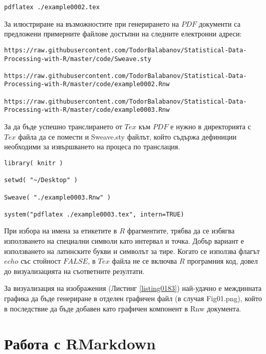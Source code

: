 \begin{lstlisting}[caption=Транслиране от Tex до PDF, label=listing0181]
pdflatex ./example0002.tex
\end{lstlisting}

За илюстриране на възможностите при генерирането на $PDF$ документи са предложени примерните файлове достъпни на следните електронни адреси:

\begin{lstlisting}[caption=Адрес на примерени $LaTeX$ документи, label=listing0182]
https://raw.githubusercontent.com/TodorBalabanov/Statistical-Data-Processing-with-R/master/code/Sweave.sty

https://raw.githubusercontent.com/TodorBalabanov/Statistical-Data-Processing-with-R/master/code/example0002.Rnw

https://raw.githubusercontent.com/TodorBalabanov/Statistical-Data-Processing-with-R/master/code/example0003.Rnw
\end{lstlisting}

За да бъде успешно транслирането от $Tex$ към $PDF$ е нужно в директорията с $Tex$ файла да се помести и Sweave.sty файлът, който съдържа дефиниции необходими за извършването на процеса по транслация. 

\begin{lstlisting}[caption=Линейна регресия на разходи спрямо спестявания, label=listing0183]
library( knitr )

setwd( "~/Desktop" )

Sweave( "./example0003.Rnw" )

system("pdflatex ./example0003.tex", intern=TRUE)
\end{lstlisting}

При избора на имена за етикетите в $R$ фрагментите, трябва да се избягва използването на специални символи като  интервал и точка. Добър вариант е използването на латинските букви и символът за тире. Когато се използва флагът $echo$ със стойност $FALSE$, в $Tex$ файла не се включва $R$ програмния код, довел до визуализацията на съответните резултати. 

За визуализация на изображения (Листинг \ref{listing0183}) най-удачно е междинната графика да бъде генериране в отделен графичен файл (в случая Fig01.png), който в последствие да бъде добавен като графичен компонент в Rnw документа.

\section{Работа с RMarkdown}

